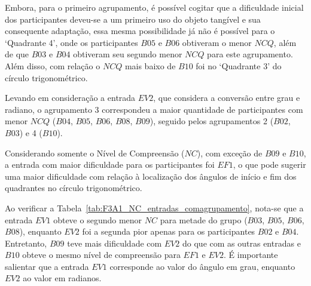 Embora, para o primeiro agrupamento, é possível cogitar que a dificuldade inicial dos participantes deveu-se a um primeiro uso do objeto tangível e sua consequente adaptação, essa mesma possibilidade já não é possível para o `Quadrante 4', onde os participantes $B05$ e $B06$ obtiveram o menor $NCQ$, além de que $B03$ e $B04$ obtiveram seu segundo menor $NCQ$ para este agrupamento. Além disso, com relação o $NCQ$ mais baixo de $B10$ foi no `Quadrante 3' do círculo trigonométrico.

Levando em consideração a entrada $EV2$, que considera a conversão entre grau e radiano, o agrupamento 3 correspondeu a maior quantidade de participantes com menor $NCQ$ ($B04$, $B05$, $B06$, $B08$, $B09$), seguido pelos agrupamentos 2 ($B02$, $B03$) e 4 ($B10$).

Considerando somente o Nível de Compreensão ($NC$), com exceção de $B09$ e $B10$, a entrada com maior dificuldade para os participantes foi $EF1$, o que pode sugerir uma maior dificuldade com relação à localização dos ângulos de início e fim dos quadrantes no círculo trigonométrico.

Ao verificar a Tabela~\ref{tab:F3A1_NC_entradas_comagrupamento}, nota-se que a entrada $EV1$ obteve o segundo menor $NC$ para metade do grupo ($B03$, $B05$, $B06$, $B08$), enquanto $EV2$ foi a segunda pior apenas para os participantes $B02$ e $B04$. Entretanto, $B09$ teve mais dificuldade com $EV2$ do que com as outras entradas e $B10$ obteve o mesmo nível de compreensão para $EF1$ e $EV2$. É importante salientar que a entrada $EV1$ corresponde ao valor do ângulo em grau, enquanto $EV2$ ao valor em radianos.

